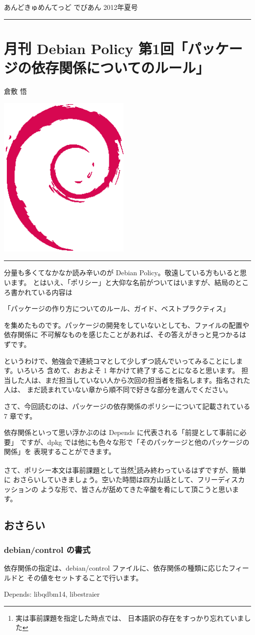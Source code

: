 \documentclass[mingoth,a4paper]{jsarticle}
\renewcommand{\dancersection}[2]{%
\newpage
あんどきゅめんてっど でびあん 2012年夏号
%
\vspace{0.1mm}\\
{\color{dancerdarkblue}\rule{\hsize}{2mm}}

%
%
\begin{minipage}[t]{0.6\hsize}
\color{dancerdarkblue}
\vspace{1cm}
\section{#1}
\hfill{}#2\\
\end{minipage}
\begin{minipage}[t]{0.4\hsize}
\vspace{-2cm}
\hfill{}\includegraphics[height=8cm]{image200502/openlogo-nd.eps}\\
\vspace{-5cm}
\end{minipage}
%
{\color{dancerlightblue}\rule{0.66\hsize}{2mm}}
%
\vspace{2cm}
}
\begin{document}
\clearpage

\dancersection{月刊 Debian Policy 第1回「パッケージの依存関係についてのルール」}{倉敷 悟}

分量も多くてなかなか読み辛いのが Debian Policy。敬遠している方もいると思います。
とはいえ、「ポリシー」と大仰な名前がついてはいますが、結局のところ書かれている内容は

「パッケージの作り方についてのルール、ガイド、ベストプラクティス」

を集めたものです。パッケージの開発をしていないとしても、ファイルの配置や依存関係に
不可解なものを感じたことがあれば、その答えがきっと見つかるはずです。


というわけで、勉強会で連続コマとして少しずつ読んでいってみることにします。いろいろ
含めて、おおよそ 1 年かけて終了することになると思います。
担当した人は、まだ担当していない人から次回の担当者を指名します。指名された人は、
まだ読まれていない章から順不同で好きな部分を選んでください。

さて、今回読むのは、パッケージの依存関係のポリシーについて記載されている 7 章です。

依存関係といって思い浮かぶのは Depends に代表される「前提として事前に必要」
ですが、dpkg では他にも色々な形で「そのパッケージと他のパッケージの関係」を
表現することができます。

さて、ポリシー本文は事前課題として当然\footnote{実は事前課題を指定した時点では、
日本語訳の存在をすっかり忘れていました}読み終わっているはずですが、簡単に
おさらいしていきましょう。空いた時間は四方山話として、フリーディスカッションの
ような形で、皆さんが舐めてきた辛酸を肴にして頂こうと思います。

\subsection{おさらい}
\subsubsection{debian/control の書式}

依存関係の指定は、debian/control ファイルに、依存関係の種類に応じたフィールドと
その値をセットすることで行います。

\begin{commandline}
Depends: libqdbm14, libestraier
\end{commandline}
\end{document}
